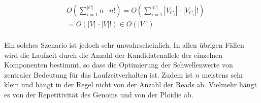 \begin{equation} \label{eqn:4-27}
\tag{4-27}
\begin{aligned}
&\ {} O\left(\sum_{i=1}^{|C|} n  \, \cdotp n! \right) = O\left(\sum_{i=1}^{|C|} |V_{C_{i}}|  \, \cdotp |V_{C_{i}}|! \right) \\
&\ = O(|V|  \, \cdotp |V|!) \in O(|V|!)\\
\end{aligned}
\end{equation}

Ein solches Szenario ist jedoch sehr unwahrscheinlich. In allen übrigen Fällen wird die Laufzeit durch die Anzahl der Kandidatenallele der einzelnen Komponenten bestimmt, so dass die Optimierung der Schwellenwerte von zentraler Bedeutung für das Laufzeitverhalten ist. Zudem ist $n$ meistens sehr klein und hängt in der Regel nicht von der Anzahl der Reads ab. Vielmehr hängt es von der Repetitivität des Genoms und von der Ploidie ab.
\let\cleardoublepage\clearpage